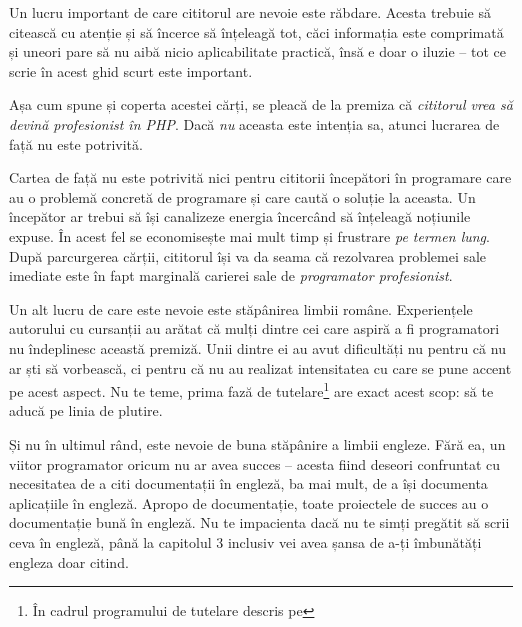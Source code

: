 Un lucru important de care cititorul are nevoie este răbdare. Acesta trebuie să
citească cu atenție și să încerce să înțeleagă tot, căci informația este
comprimată și uneori pare să nu aibă nicio aplicabilitate practică, însă e doar
o iluzie -- tot ce scrie în acest ghid scurt este important.


Așa cum spune și coperta acestei cărți, se pleacă de la premiza că
\textit{cititorul vrea să devină profesionist în PHP}. Dacă \textit{nu} aceasta
este intenția sa, atunci lucrarea de față nu este potrivită.

Cartea de față nu este potrivită nici pentru cititorii începători în programare
care au o problemă concretă de programare și care caută o soluție la aceasta.
Un începător ar trebui să își canalizeze energia încercând să înțeleagă
noțiunile expuse. În acest fel se economisește mai mult timp și frustrare
\textit{pe termen lung}. După parcurgerea cărții, cititorul își va da seama că
rezolvarea problemei sale imediate este în fapt marginală carierei sale de
\textit{programator profesionist}.


Un alt lucru de care este nevoie este stăpânirea limbii române. Experiențele
autorului cu cursanții au arătat că mulți dintre cei care aspiră a fi
programatori nu îndeplinesc această premiză. Unii dintre ei au avut dificultăți
nu pentru că nu ar ști să vorbească, ci pentru că nu au realizat intensitatea
cu care se pune accent pe acest aspect.
Nu te teme, prima fază de tutelare\footnote{În cadrul programului de tutelare
descris pe {\phpro}} are exact acest scop: să te aducă pe linia de plutire.

Și nu în ultimul rând, este nevoie de buna stăpânire a limbii engleze. Fără ea,
un viitor programator oricum nu ar avea succes -- acesta fiind deseori
confruntat cu necesitatea de a citi documentații în engleză, ba mai mult, de
a își documenta aplicațiile în engleză. Apropo de documentație, toate proiectele
de succes au o documentație bună în engleză. Nu te impacienta dacă nu te simți
pregătit să scrii ceva în engleză, până la capitolul 3 inclusiv vei avea șansa
de a-ți îmbunătăți engleza doar citind.


